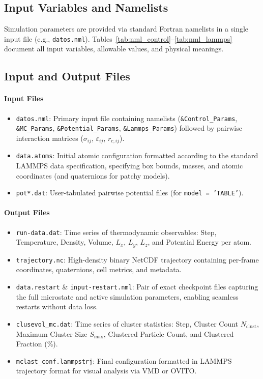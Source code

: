 \documentclass[final,5p,times,twocolumn]{elsarticle}
\begin{document}
\subsection{Input Variables and Namelists}
\label{sec:soft_namelists}

Simulation parameters are provided via standard Fortran namelists in a
single input file (e.g.,
\texttt{datos.nml}). Tables~\ref{tab:nml_control}--\ref{tab:nml_lammps}
document all input variables, allowable values, and physical meanings. 


\subsection{Input and Output Files}
\label{sec:soft_files}

\paragraph{Input Files}
\begin{itemize}
    \item \texttt{datos.nml}: Primary input file containing namelists (\texttt{\&Control\_Params}, \texttt{\&MC\_Params}, \texttt{\&Potential\_Params}, \texttt{\&Lammps\_Params}) followed by pairwise interaction matrices ($\sigma_{ij}$, $\varepsilon_{ij}$, $r_{c,ij}$).
    \item \texttt{data.atoms}: Initial atomic configuration formatted according to the standard LAMMPS data specification, specifying box bounds, masses, and atomic coordinates (and quaternions for patchy models).
    \item \texttt{pot*.dat}: User-tabulated pairwise potential files (for \texttt{model = 'TABLE'}).
\end{itemize}

\paragraph{Output Files}
\begin{itemize}
    \item \texttt{run-data.dat}: Time series of thermodynamic observables: Step, Temperature, Density, Volume, $L_x$, $L_y$, $L_z$, and Potential Energy per atom.
    \item \texttt{trajectory.nc}: High-density binary NetCDF trajectory containing per-frame coordinates, quaternions, cell metrics, and metadata.
    \item \texttt{data.restart} \& \texttt{input-restart.nml}: Pair of exact checkpoint files capturing the full microstate and active simulation parameters, enabling seamless restarts without data loss.
    \item \texttt{clusevol\_mc.dat}: Time series of cluster statistics: Step, Cluster Count $N_{\text{clust}}$, Maximum Cluster Size $S_{\max}$, Clustered Particle Count, and Clustered Fraction (\%).
    \item \texttt{mclast\_conf.lammpstrj}: Final configuration formatted in LAMMPS trajectory format for visual analysis via VMD or OVITO.
\end{itemize}
\end{document}
